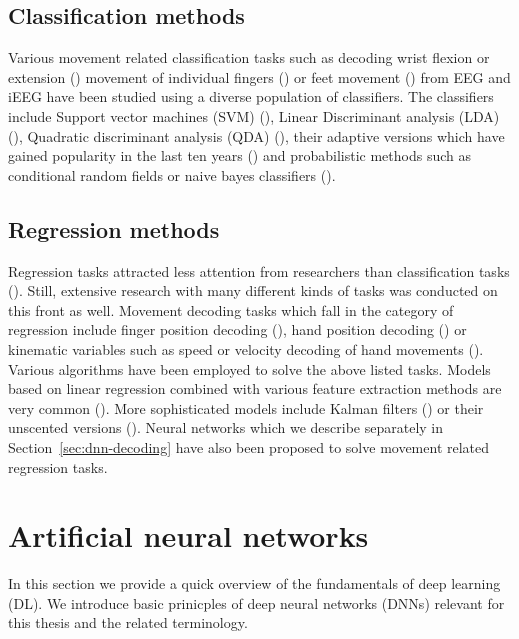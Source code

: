 \subsection{Classification methods}
Various movement related classification tasks such as decoding wrist flexion or extension (\cite{wrist-flexion}) movement of individual fingers (\cite{cond-rf-finger-class, lda-finger-movement-classification}) or feet movement (\cite{feet-movement}) from EEG and iEEG have been studied using a diverse population of classifiers.  
The classifiers include Support vector machines (SVM) (\cite{svm-alg}), Linear Discriminant analysis (LDA) (\cite{lda-paper}), Quadratic discriminant analysis (QDA) (\cite{qda-paper}), their adaptive versions which have gained popularity in the last ten years (\cite{lotte2018review}) and probabilistic methods such as conditional random fields or naive bayes classifiers (\cite{bayesian-decoding, cond-rf-finger-class}). 


\subsection{Regression methods}
Regression tasks attracted less attention from researchers than classification tasks (\cite{volkova-review}).
Still, extensive research with many different kinds of tasks was conducted on this front as well.
Movement decoding tasks which fall in the category of regression include finger position decoding (\cite{Pistohl2008PredictionOA}), hand position decoding (\cite{ball-2019}) or
kinematic variables such as speed or velocity decoding of hand movements (\cite{hammer-role-2013, hammer-predominance-2016, Hammer-2021, kalman-filters-velocity, linear-regression-eeg-hand-3d}).
Various algorithms have been employed to solve the above listed tasks. 
Models based on linear regression combined with various feature extraction methods are very common (\cite{hammer-role-2013, hammer-predominance-2016, eeg-hand-moving, linear-regression-eeg-hand-3d}).
More sophisticated models include Kalman filters (\cite{kalman-filters-velocity}) or their unscented versions (\cite{uns-kalman-filters-gait-decoding}).
Neural networks which we describe separately in Section~\ref{sec:dnn-decoding} have also been proposed to solve movement related regression tasks.

\section{Artificial neural networks}\label{sec:artificial-neural-networks}
In this section we provide a quick overview of the fundamentals of deep learning (DL). 
We introduce basic prinicples of deep neural networks (DNNs) relevant for this thesis and the related terminology.


